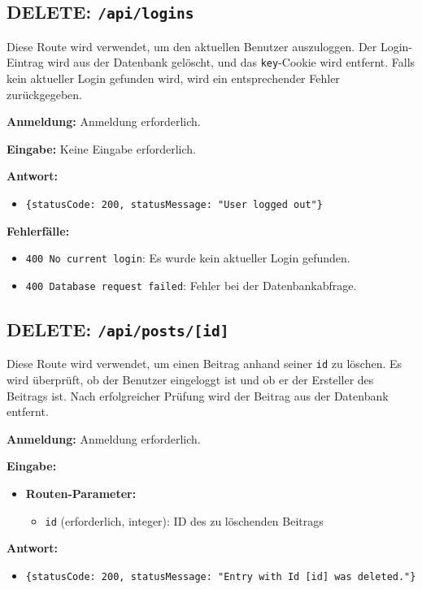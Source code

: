 \documentclass[a4paper,12pt]{article}
\begin{document}
\newpage
\subsection{DELETE: \texttt{/api/logins}}

Diese Route wird verwendet, um den aktuellen Benutzer auszuloggen. Der
Login-Eintrag wird aus der Datenbank gelöscht, und das \texttt{key}-Cookie wird
entfernt. Falls kein aktueller Login gefunden wird, wird ein entsprechender
Fehler zurückgegeben.

\textbf{Anmeldung:} Anmeldung erforderlich.

\textbf{Eingabe:} Keine Eingabe erforderlich.

\textbf{Antwort:}
\begin{itemize}
    \item \texttt{\{statusCode: 200,
        statusMessage: "User logged out"\}}
\end{itemize}

\textbf{Fehlerfälle:}
\begin{itemize}
    \item \texttt{400 No current login}:
        Es wurde kein aktueller Login gefunden.
    \item \texttt{400 Database request failed}:
        Fehler bei der Datenbankabfrage.
\end{itemize}

\newpage
\subsection{DELETE: \texttt{/api/posts/[id]}}

Diese Route wird verwendet, um einen Beitrag anhand seiner \texttt{id} zu
löschen. Es wird überprüft, ob der Benutzer eingeloggt ist und ob er der
Ersteller des Beitrags ist. Nach erfolgreicher Prüfung wird der Beitrag aus der
Datenbank entfernt.

\textbf{Anmeldung:} Anmeldung erforderlich.

\textbf{Eingabe:}
\begin{itemize}
    \item \textbf{Routen-Parameter:}
    \begin{itemize}
        \item \texttt{id} (erforderlich, integer):
            ID des zu löschenden Beitrags
    \end{itemize}
\end{itemize}

\textbf{Antwort:}
\begin{itemize}
    \item \texttt{\{statusCode: 200,
        statusMessage: "Entry with Id [id] was deleted."\}}
\end{itemize}
\end{document}
